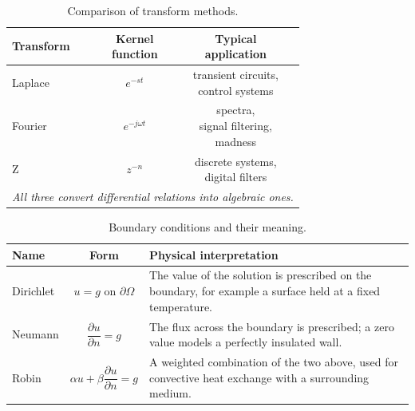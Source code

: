\documentclass[11pt]{article}
\begin{document}
\begin{table}[H]
\centering
\caption{Comparison of transform methods.}
\renewcommand{\arraystretch}{1.2}
\begin{tabular}{lcc}
\toprule
\textbf{Transform} & \makecell{\textbf{Kernel}\\\textbf{function}} &
\makecell{\textbf{Typical}\\\textbf{application}} \\
\midrule
Laplace & $e^{-st}$ & \makecell{transient circuits,\\control systems} \\
Fourier & $e^{-j\omega t}$ & \makecell{spectra,\\signal filtering,\\madness} \\
Z & $z^{-n}$ & \makecell{discrete systems,\\digital filters} \\
\midrule
\multicolumn{3}{c}{\textit{All three convert differential relations into algebraic ones.}} \\
\bottomrule
\end{tabular}
\end{table}


\begin{table}[H]
\centering
\caption{Boundary conditions and their meaning.}
\renewcommand{\arraystretch}{1.3}
\begin{tabularx}{0.92\textwidth}{|l|c|X|}
\hline
\textbf{Name} & \textbf{Form} & \textbf{Physical interpretation} \\
\hline
Dirichlet & $u = g$ on $\partial\Omega$ &
The value of the solution is prescribed on the boundary, for example a
surface held at a fixed temperature. \\
\hline
Neumann & $\dfrac{\partial u}{\partial n} = g$ &
The flux across the boundary is prescribed; a zero value models a
perfectly insulated wall. \\
\hline
Robin & $\alpha u + \beta \dfrac{\partial u}{\partial n} = g$ &
A weighted combination of the two above, used for convective heat
exchange with a surrounding medium. \\
\hline
\end{tabularx}
\end{table}
\end{document}
